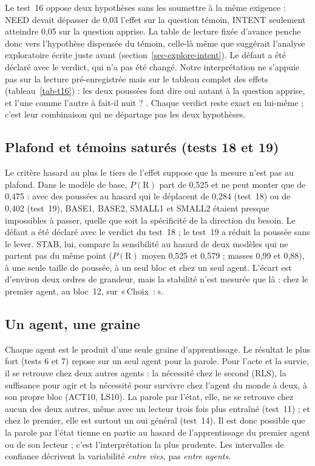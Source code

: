 \documentclass[11pt,a4paper]{article}
\newcommand{\Choix}{«\,Choix~:\,»}
\begin{document}
Le test~16 oppose deux hypothèses sans les soumettre à la même exigence : NEED devait
dépasser de 0,03 l'effet sur la question témoin, INTENT seulement atteindre 0,05 sur la
question apprise. La table de lecture fixée d'avance penche donc vers l'hypothèse dispensée
du témoin, celle-là même que suggérait l'analyse exploratoire écrite juste avant
(section~\ref{sec-explore-intent}). Le défaut a été déclaré avec le verdict, qui n'a pas été
changé. Notre interprétation ne s'appuie pas sur la lecture pré-enregistrée mais sur le
tableau complet des effets (tableau~\ref{tab-t16}) : les deux poussées font dire
\og oui \fg{} autant à la question apprise, et l'une comme l'autre à \og fait-il
nuit ? \fg{}. Chaque verdict reste exact en lui-même ; c'est leur combinaison qui ne
départage pas les deux hypothèses.

\subsection{Plafond et témoins saturés (tests 18 et 19)}

Le critère \og hasard au plus le tiers de l'effet \fg{} suppose que la mesure n'est pas au
plafond. Dans le modèle de base, $P(\mathrm R)$ part de 0,525 et ne peut monter que de 0,475 :
avec des poussées au hasard qui le déplacent de 0,284 (test~18) ou de 0,402 (test~19), BASE1,
BASE2, SMALL1 et SMALL2 étaient presque impossibles à passer, quelle que soit la spécificité
de la direction du besoin. Le défaut a été déclaré avec le verdict du test~18 ; le test~19 a
réduit la poussée sans le lever. STAB, lui, compare la sensibilité au hasard de deux modèles qui
ne partent pas du même point ($P(\mathrm R)$ moyen 0,525 et 0,579 ; masses 0,99 et 0,88), à une
seule taille de poussée, à un seul bloc et chez un seul agent. L'écart est d'environ deux ordres
de grandeur, mais la stabilité n'est mesurée que là : chez le premier agent, au bloc~12, sur
\Choix{}.

\subsection{Un agent, une graine}

Chaque agent est le produit d'une seule graine d'apprentissage. Le résultat le plus
fort (tests 6 et 7) repose sur un seul agent pour la parole. Pour l'acte et la survie,
il se retrouve chez deux autres agents : la nécessité chez le second (RLS), la
suffisance pour agir et la nécessité pour survivre chez l'agent du monde à deux, à
son propre bloc (ACT10, LS10). La parole par l'état, elle, ne se retrouve chez aucun
des deux autres, même avec un lecteur trois fois plus entraîné (test~11) ; et chez le
premier, elle est surtout un \og oui \fg{} général (test~14). Il est donc possible que
la parole par l'état tienne en partie au hasard de l'apprentissage du premier agent ou
de son lecteur ; c'est l'interprétation la plus prudente. Les intervalles de
confiance décrivent la variabilité \emph{entre vies}, pas \emph{entre agents}.
\end{document}
